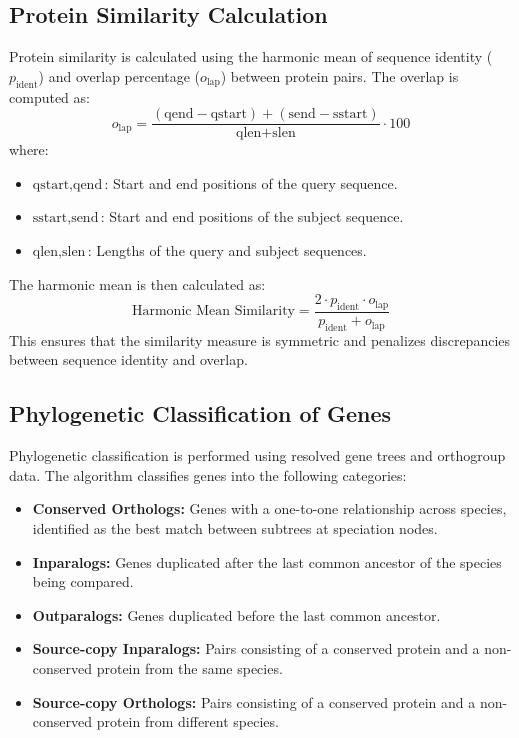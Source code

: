 \documentclass{article}
\begin{document}
\subsection{Protein Similarity Calculation}
Protein similarity is calculated using the harmonic mean of sequence identity (\(p_{\text{ident}}\)) and overlap percentage (\(o_{\text{lap}}\)) between protein pairs. The overlap is computed as:
\[
o_{\text{lap}} = \frac{(\text{qend} - \text{qstart}) + (\text{send} - \text{sstart})}{\text{qlen} + \text{slen}} \cdot 100
\]
where:
\begin{itemize}
    \item \(\text{qstart}, \text{qend}\): Start and end positions of the query sequence.
    \item \(\text{sstart}, \text{send}\): Start and end positions of the subject sequence.
    \item \(\text{qlen}, \text{slen}\): Lengths of the query and subject sequences.
\end{itemize}

The harmonic mean is then calculated as:
\[
\text{Harmonic Mean Similarity} = \frac{2 \cdot p_{\text{ident}} \cdot o_{\text{lap}}}{p_{\text{ident}} + o_{\text{lap}}}
\]
This ensures that the similarity measure is symmetric and penalizes discrepancies between sequence identity and overlap.

\subsection{Phylogenetic Classification of Genes}
Phylogenetic classification is performed using resolved gene trees and orthogroup data. The algorithm classifies genes into the following categories:
\begin{itemize}
    \item \textbf{Conserved Orthologs:} Genes with a one-to-one relationship across species, identified as the best match between subtrees at speciation nodes.
    \item \textbf{Inparalogs:} Genes duplicated after the last common ancestor of the species being compared.
    \item \textbf{Outparalogs:} Genes duplicated before the last common ancestor.
    \item \textbf{Source-copy Inparalogs:} Pairs consisting of a conserved protein and a non-conserved protein from the same species.
    \item \textbf{Source-copy Orthologs:} Pairs consisting of a conserved protein and a non-conserved protein from different species.
\end{itemize}
\end{document}
